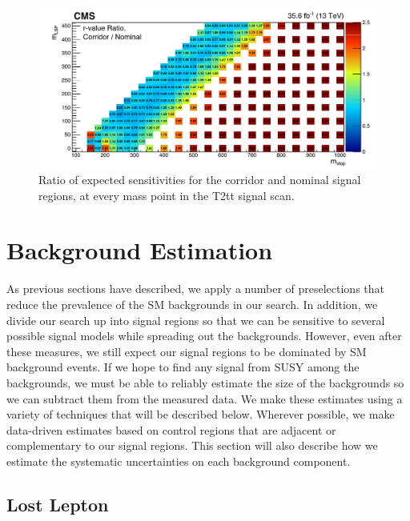\begin{figure}
\centering
\includegraphics{figures/rratioplot.pdf}
\caption{Ratio of expected sensitivities for the corridor and nominal
  signal regions, at every mass point in the T2tt signal scan.}
\label{fig:stop:rratio}
\end{figure}


\section{Background Estimation}
\label{sec:stop:bkgest}

As previous sections have described, we apply a number of
preselections that reduce the prevalence of the SM backgrounds in our
search. In addition, we divide our search up into signal
regions so that we can be sensitive to several possible signal models while
spreading out the backgrounds. However, even after these measures,
we still expect our signal regions to be dominated by SM background
events. If we hope to find any signal from SUSY among the backgrounds,
we must be able to reliably estimate the size of the backgrounds so we
can subtract them from the measured data. We make these estimates
using a variety of techniques that will be described below. Wherever
possible, we make data-driven estimates based on control regions
that are adjacent or complementary to our signal regions.
This section will also describe how we estimate the systematic
uncertainties on each background component.

\subsection{Lost Lepton}
\label{ssec:stop:lostlep}

